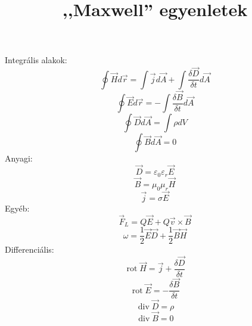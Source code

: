 \documentclass[12pt,a4paper]{article}
\title{,,Maxwell'' egyenletek}
\date{}
\DeclareMathOperator{\rot}{rot}
\DeclareMathOperator{\ddiv}{div}
\begin{document}
\maketitle 
  
\parindent 0pt

Integrális alakok:
\[\oint \vec{H} d\vec{r} = \int \vec{j} d\vec{A} + \int \frac{\delta \vec{D}}{\delta t} d\vec{A}\]
\[\oint \vec{E} d\vec{r} = -\int \frac{\delta \vec{B}}{\delta t} d\vec{A}\]
\[\oint \vec{D} d\vec{A} = \int \rho dV\]
\[\oint \vec{B} d\vec{A} = 0\]
Anyagi:
\[\vec{D} = \varepsilon_0\varepsilon_r\vec{E}\]
\[\vec{B} = \mu_0\mu_r\vec{H}\]
\[\vec{j} = \sigma \vec{E}\]
Egyéb:
\[\vec{F}_L = Q\vec{E} + Q\vec{v}\times\vec{B}\]
\[\omega = \frac{1}{2}\vec{E}\vec{D} + \frac{1}{2}\vec{B}\vec{H}\]
Differenciális:
\[\rot \vec{H} = \vec{j} + \frac{\delta \vec{D}}{\delta t}\]
\[\rot \vec{E} = -\frac{\delta \vec{B}}{\delta t}\]
\[\ddiv \vec{D} = \rho\]
\[\ddiv \vec{B} = 0\]
  
\end{document}
